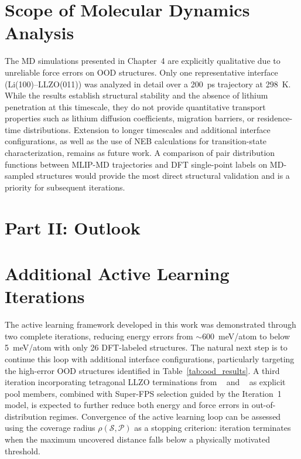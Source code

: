 \documentclass[12pt,a4paper,oneside]{book}
\begin{document}
\section{Scope of Molecular Dynamics Analysis}

The MD simulations presented in Chapter~4 are explicitly qualitative due to unreliable force errors on OOD structures. Only one
representative interface (Li(100)--LLZO(011)) was analyzed in detail over a 200~ps
trajectory at 298~K. While the results establish structural stability and the absence
of lithium penetration at this timescale, they do not provide quantitative transport
properties such as lithium diffusion coefficients, migration barriers, or
residence-time distributions. Extension to longer timescales and additional interface
configurations, as well as the use of NEB calculations for transition-state
characterization, remains as future work. A comparison of pair distribution functions between MLIP-MD trajectories and
DFT single-point labels on MD-sampled structures would provide the most direct
structural validation and is a priority for subsequent iterations.

\label{ch:future_work}

\section*{Part II: Outlook}

\section{Additional Active Learning Iterations}

The active learning framework developed in this work was demonstrated through two
complete iterations, reducing energy errors from $\sim$600~meV/atom to below
5~meV/atom with only 26 DFT-labeled structures. The natural next step is to continue
this loop with additional interface configurations, particularly targeting the
high-error OOD structures identified in Table~\ref{tab:ood_results}. A third
iteration incorporating tetragonal LLZO terminations from
\citeauthor{Burov2024LiLLZOChargeTransfer}~\cite{Burov2024LiLLZOChargeTransfer} and \citeauthor{Iwasaki2022DFT_Li_LLZO_PSSB}~\cite{Iwasaki2022DFT_Li_LLZO_PSSB} as explicit pool members, combined
with Super-FPS selection guided by the Iteration~1 model, is expected to further
reduce both energy and force errors in out-of-distribution regimes. Convergence of
the active learning loop can be assessed using the coverage radius $\rho(\mathcal{S},
\mathcal{P})$ as a stopping criterion: iteration terminates when the maximum
uncovered distance falls below a physically motivated threshold.
\end{document}
